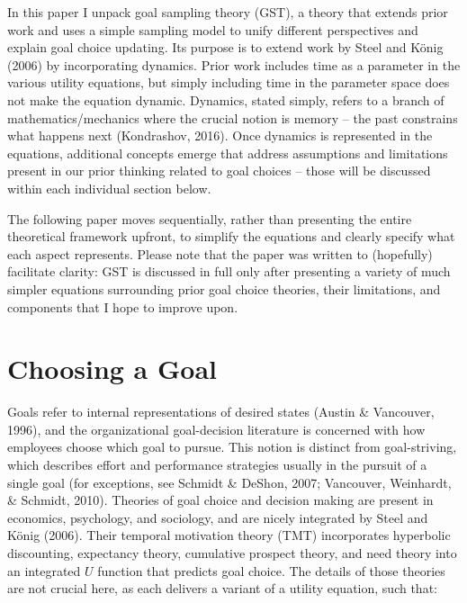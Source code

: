 \documentclass[english,,man]{apa6}
\theoremstyle{definition}
\theoremstyle{definition}
\theoremstyle{definition}
\theoremstyle{remark}
\begin{document}
In this paper I unpack goal sampling theory (GST), a theory that extends
prior work and uses a simple sampling model to unify different
perspectives and explain goal choice updating. Its purpose is to extend
work by Steel and König (2006) by incorporating dynamics. Prior work
includes time as a parameter in the various utility equations, but
simply including time in the parameter space does not make the equation
dynamic. Dynamics, stated simply, refers to a branch of
mathematics/mechanics where the crucial notion is memory -- the past
constrains what happens next (Kondrashov, 2016). Once dynamics is
represented in the equations, additional concepts emerge that address
assumptions and limitations present in our prior thinking related to
goal choices -- those will be discussed within each individual section
below.

The following paper moves sequentially, rather than presenting the
entire theoretical framework upfront, to simplify the equations and
clearly specify what each aspect represents. Please note that the paper
was written to (hopefully) facilitate clarity: GST is discussed in full
only after presenting a variety of much simpler equations surrounding
prior goal choice theories, their limitations, and components that I
hope to improve upon.

\hypertarget{choosing-a-goal}{%
\section{Choosing a Goal}\label{choosing-a-goal}}

Goals refer to internal representations of desired states (Austin \&
Vancouver, 1996), and the organizational goal-decision literature is
concerned with how employees choose which goal to pursue. This notion is
distinct from goal-striving, which describes effort and performance
strategies usually in the pursuit of a single goal (for exceptions, see
Schmidt \& DeShon, 2007; Vancouver, Weinhardt, \& Schmidt, 2010).
Theories of goal choice and decision making are present in economics,
psychology, and sociology, and are nicely integrated by Steel and König
(2006). Their temporal motivation theory (TMT) incorporates hyperbolic
discounting, expectancy theory, cumulative prospect theory, and need
theory into an integrated \(U\) function that predicts goal choice. The
details of those theories are not crucial here, as each delivers a
variant of a utility equation, such that:
\end{document}
